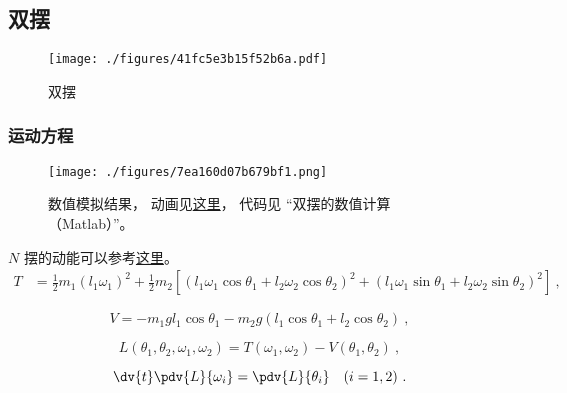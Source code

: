 
\begin{issues}
\issueDraft
\end{issues}


\subsection{双摆}
\begin{figure}[ht]
\centering
\texttt{[image: ./figures/41fc5e3b15f52b6a.pdf]}
\caption{双摆} \label{fig_Pendu3_2}
\end{figure}

\subsubsection{运动方程}
\begin{figure}[ht]
\centering
\texttt{[image: ./figures/7ea160d07b679bf1.png]}
\caption{数值模拟结果， 动画见\href{https://wuli.wiki/apps/DbPend.html}{这里}， 代码见 “双摆的数值计算（Matlab）”。} \label{fig_Pendu3_3}
\end{figure}

$N$ 摆的动能可以参考\href{https://travisdoesmath.github.io/pendulum-explainer/}{这里}。
\begin{equation}
\begin{aligned}
T &= \frac{1}{2} m_1 (l_1 \omega_1)^2 + \frac{1}{2} m_2 [(l_1 \omega_1 \cos\theta_1 + l_2 \omega_2 \cos\theta_2)^2 + (l_1 \omega_1 \sin\theta_1 + l_2 \omega_2 \sin\theta_2)^2]~,
\end{aligned}
\end{equation}

\begin{equation}  
V = -m_1 g l_1 \cos \theta_1 - m_2 g (l_1\cos \theta_1 + l_2 \cos \theta_2)~,
\end{equation}

\begin{equation}
L(\theta_1, \theta_2, \omega_1, \omega_2) = T(\omega_1, \omega_2) - V(\theta_1, \theta_2)~,
\end{equation}

\begin{equation}\label{eq_Pendu3_1}
\dv{t}\pdv{L}{\omega_i} = \pdv{L}{\theta_i} \quad (i=1,2)~.
\end{equation}


